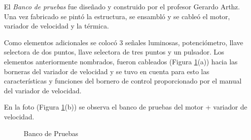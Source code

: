 El \textit{Banco de pruebas} fue diseñado y construido por el profesor Gerardo Arthz. Una vez fabricado se pintó la estructura, se ensambló y se cableó el motor, variador de velocidad y la térmica.

Como elementos adicionales se colocó 3 señales luminosas, potenciómetro, llave selectora de dos puntos, llave selectora de tres puntos y un pulsador. Los elementos anteriormente nombrados, fueron cableados (Figura \ref{fig:banco}(a)) hacia las borneras del variador de velocidad y se tuvo en cuenta para esto las características y funciones del bornero de control proporcionado por el manual del variador de velocidad\cite{InstaManual}. 

En la foto (Figura \ref{fig:banco}(b)) se observa el banco de pruebas del motor + variador de velocidad.

\begin{figure}[H]
	\centering
	\caption{Banco de Pruebas} \label{fig:banco}
\end{figure}




